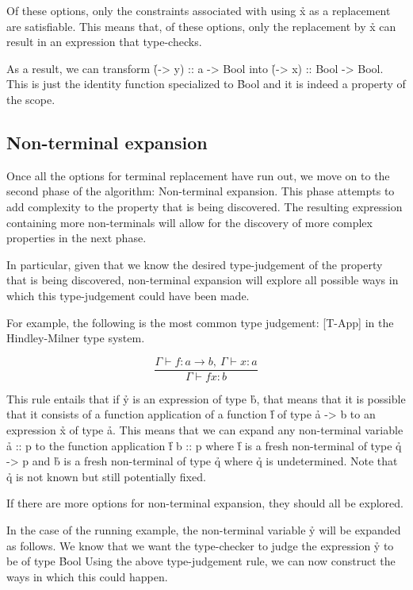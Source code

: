 \documentclass[a4paper, 11pt, onepage]{article}
\begin{document}
Of these options, only the constraints associated with using \h{x} as a replacement are satisfiable.
This means that, of these options, only the replacement by \h{x} can result in an expression that type-checks.

As a result, we can transform \h{(\x -> y) :: a -> Bool} into \h{(\x -> x) :: Bool -> Bool}.
This is just the identity function specialized to \h{Bool} and it is indeed a property of the scope.


\subsection{Non-terminal expansion}

Once all the options for terminal replacement have run out, we move on to the second phase of the algorithm: Non-terminal expansion.
This phase attempts to add complexity to the property that is being discovered.
The resulting expression containing more non-terminals will allow for the discovery of more complex properties in the next phase.

In particular, given that we know the desired type-judgement of the property that is being discovered,
non-terminal expansion will explore all possible ways in which this type-judgement could have been made.

For example, the following is the most common type judgement:
[T-App] in the Hindley-Milner type system. \cite{HM}

\[
  \frac{\Gamma \vdash f : a \rightarrow b,\ \Gamma \vdash x : a}{\Gamma \vdash f x : b}
\]

This rule entails that if \h{y} is an expression of type \h{b}, that means that it is possible that it consists of a function application of a function \h{f} of type \h{a -> b} to an expression \h{x} of type \h{a}.
This means that we can expand any non-terminal variable \h{a :: p} to the function application \h{f b :: p} where \h{f} is a fresh non-terminal of type \h{q -> p} and \h{b} is a fresh non-terminal of type \h{q} where \h{q} is undetermined.
Note that \h{q} is not known but still potentially fixed.

If there are more options for non-terminal expansion, they should all be explored.

In the case of the running example, the non-terminal variable \h{y} will be expanded as follows.
We know that we want the type-checker to judge the expression \h{y} to be of type \h{Bool}
Using the above type-judgement rule, we can now construct the ways in which this could happen.
\end{document}
